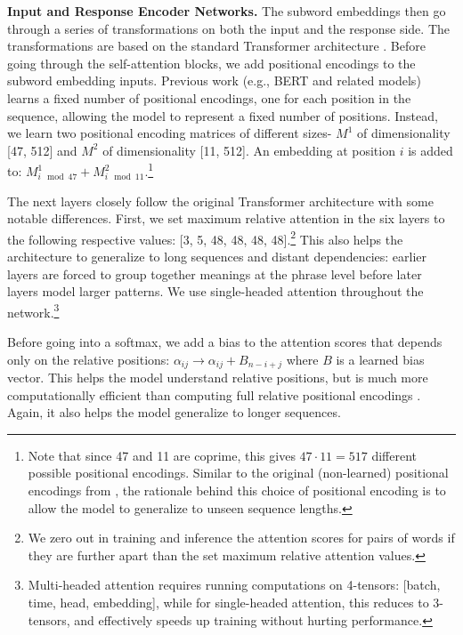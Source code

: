 \documentclass[11pt,a4paper]{article}
\begin{document}
\vspace{1.3mm}
\noindent \textbf{Input and Response Encoder Networks.}
The subword embeddings then go through a series of transformations on both the input and the response side. The transformations are based on the standard Transformer architecture \cite{Vaswani:2017nips}. Before going through the self-attention blocks, we add positional encodings to the subword embedding inputs. Previous work (e.g., BERT and related models) \cite[\textit{inter alia}]{Devlin:2018arxiv,Lan:2019albert} learns a fixed number of positional encodings, one for each position in the sequence, allowing the model to represent a fixed number of positions. Instead, we learn two positional encoding matrices of different sizes- $M^1$ of dimensionality [47, 512] and $M^2$ of dimensionality [11, 512]. An embedding at position $i$ is added to: $M^1_{i \mod 47} + M^2_{i \mod 11}$.\footnote{Note that since 47 and 11 are coprime, this gives $47\cdot11=517$ different possible positional encodings. Similar to the original (non-learned) positional encodings from , the rationale behind this choice of positional encoding is to allow the model to generalize to unseen sequence lengths.}



The next layers closely follow the original Transformer architecture with some notable differences. First, we set maximum relative attention \cite{Shaw:2018naacl} in the six layers to the following respective values: [3, 5, 48, 48, 48, 48].\footnote{We zero out in training and inference the attention scores for pairs of words if they are further apart than the set maximum relative attention values.} This also helps the architecture to generalize to long sequences and distant dependencies: earlier layers are forced to group together meanings at the phrase level before later layers model larger patterns. We use single-headed attention throughout the network.\footnote{Multi-headed attention requires running computations on 4-tensors: [batch, time, head, embedding], while for single-headed attention, this reduces to 3-tensors, and effectively speeds up training without hurting performance.}

Before going into a softmax, we add a bias to the attention scores that depends only on the relative positions: $\alpha_{ij} \rightarrow \alpha_{ij} + B_{n-i+j}$ where $B$ is a learned bias vector. This helps the model understand relative positions, but is much more computationally efficient than computing full relative positional encodings \cite{Shaw:2018naacl}. Again, it also helps the model generalize to longer sequences.
\end{document}
